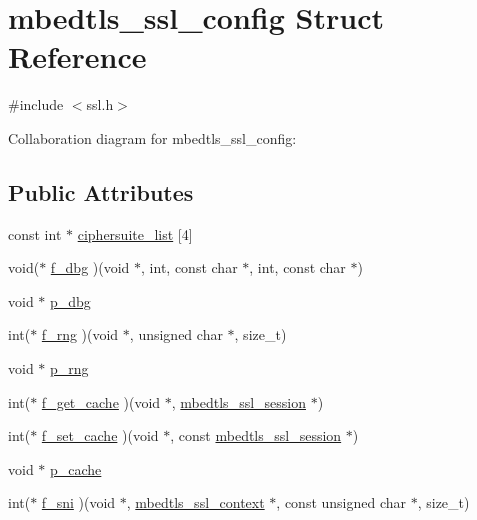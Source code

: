 \hypertarget{structmbedtls__ssl__config}{}\section{mbedtls\+\_\+ssl\+\_\+config Struct Reference}
\label{structmbedtls__ssl__config}


{\ttfamily \#include $<$ssl.\+h$>$}



Collaboration diagram for mbedtls\+\_\+ssl\+\_\+config\+:
\subsection*{Public Attributes}
\begin{DoxyCompactItemize}
\item 
const int $\ast$ \mbox{\hyperlink{structmbedtls__ssl__config_a15e716727b7dd508dfb96e270f37919f}{ciphersuite\+\_\+list}} \mbox{[}4\mbox{]}
\item 
void($\ast$ \mbox{\hyperlink{structmbedtls__ssl__config_a9e57da8e5afa816d105a1ae95eb2e23d}{f\+\_\+dbg}} )(void $\ast$, int, const char $\ast$, int, const char $\ast$)
\item 
void $\ast$ \mbox{\hyperlink{structmbedtls__ssl__config_ad591b46fdb117d844c0a5f7366423c48}{p\+\_\+dbg}}
\item 
int($\ast$ \mbox{\hyperlink{structmbedtls__ssl__config_a9250c08f11a4e549b6f9d48ba9a977d1}{f\+\_\+rng}} )(void $\ast$, unsigned char $\ast$, size\+\_\+t)
\item 
void $\ast$ \mbox{\hyperlink{structmbedtls__ssl__config_a1eff6c9817251b686e8f518597590476}{p\+\_\+rng}}
\item 
int($\ast$ \mbox{\hyperlink{structmbedtls__ssl__config_a92d52d27abd228e5e5293ea41b065d9a}{f\+\_\+get\+\_\+cache}} )(void $\ast$, \mbox{\hyperlink{structmbedtls__ssl__session}{mbedtls\+\_\+ssl\+\_\+session}} $\ast$)
\item 
int($\ast$ \mbox{\hyperlink{structmbedtls__ssl__config_a2664effc0267e63b27cc95eea8213865}{f\+\_\+set\+\_\+cache}} )(void $\ast$, const \mbox{\hyperlink{structmbedtls__ssl__session}{mbedtls\+\_\+ssl\+\_\+session}} $\ast$)
\item 
void $\ast$ \mbox{\hyperlink{structmbedtls__ssl__config_ac5f5d3d7a788e65c722db381c66ecb24}{p\+\_\+cache}}
\item 
int($\ast$ \mbox{\hyperlink{structmbedtls__ssl__config_a00e330604cc40f0097b5f8ad3fb7b297}{f\+\_\+sni}} )(void $\ast$, \mbox{\hyperlink{structmbedtls__ssl__context}{mbedtls\+\_\+ssl\+\_\+context}} $\ast$, const unsigned char $\ast$, size\+\_\+t)

\end{DoxyCompactItemize}
